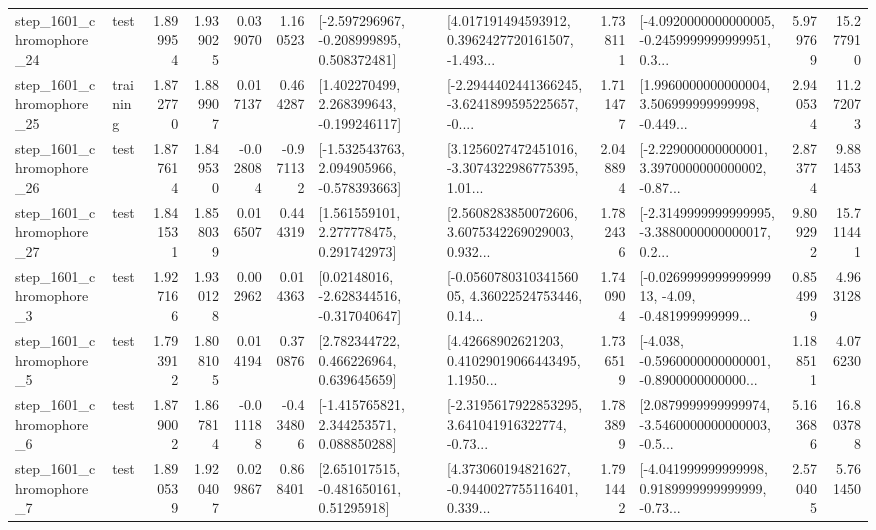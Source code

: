 \begin{tabular}{llrrrrllrlrr}
 step\_1601\_chromophore\_24 &      test &      1.899954 &    1.939025 &      0.039070 &  1.160523 &   [-2.597296967, -0.208999895, 0.508372481] &  [4.017191494593912, 0.3962427720161507, -1.493... &       1.738111 &  [-4.0920000000000005, -0.2459999999999951, 0.3... &            5.979769 &         15.277910 \\
 step\_1601\_chromophore\_25 &  training &      1.872770 &    1.889907 &      0.017137 &  0.464287 &    [1.402270499, 2.268399643, -0.199246117] &  [-2.2944402441366245, -3.6241899595225657, -0.... &       1.711477 &  [1.9960000000000004, 3.506999999999998, -0.449... &            2.940534 &         11.272073 \\
 step\_1601\_chromophore\_26 &      test &      1.877614 &    1.849530 &     -0.028084 & -0.971132 &   [-1.532543763, 2.094905966, -0.578393663] &  [3.1256027472451016, -3.3074322986775395, 1.01... &       2.048894 &  [-2.229000000000001, 3.3970000000000002, -0.87... &            2.873774 &          9.881453 \\
 step\_1601\_chromophore\_27 &      test &      1.841531 &    1.858039 &      0.016507 &  0.444319 &     [1.561559101, 2.277778475, 0.291742973] &  [2.5608283850072606, 3.6075342269029003, 0.932... &       1.782436 &  [-2.3149999999999995, -3.3880000000000017, 0.2... &            9.809292 &         15.711441 \\
  step\_1601\_chromophore\_3 &      test &      1.927166 &    1.930128 &      0.002962 &  0.014363 &    [0.02148016, -2.628344516, -0.317040647] &  [-0.056078031034156005, 4.36022524753446, 0.14... &       1.740904 &  [-0.026999999999999913, -4.09, -0.481999999999... &            0.854999 &          4.963128 \\
  step\_1601\_chromophore\_5 &      test &      1.793912 &    1.808105 &      0.014194 &  0.370876 &     [2.782344722, 0.466226964, 0.639645659] &  [4.42668902621203, 0.41029019066443495, 1.1950... &       1.736519 &  [-4.038, -0.5960000000000001, -0.8900000000000... &            1.188511 &          4.076230 \\
  step\_1601\_chromophore\_6 &      test &      1.879002 &    1.867814 &     -0.011188 & -0.434806 &    [-1.415765821, 2.344253571, 0.088850288] &  [-2.3195617922853295, 3.641041916322774, -0.73... &       1.783899 &  [2.0879999999999974, -3.5460000000000003, -0.5... &            5.163686 &         16.803788 \\
  step\_1601\_chromophore\_7 &      test &      1.890539 &    1.920407 &      0.029867 &  0.868401 &     [2.651017515, -0.481650161, 0.51295918] &  [4.373060194821627, -0.9440027755116401, 0.339... &       1.791442 &  [-4.041999999999998, 0.9189999999999999, -0.73... &            2.570405 &          5.761450 \\

\end{tabular}
